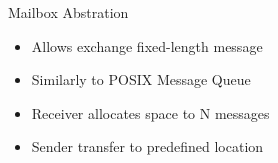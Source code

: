 		\begin{frame}[fragile]{Mailbox Abstration}
			\begin{itemize}
				\item Allows exchange fixed-length message
				\item Similarly to POSIX Message Queue
				\item Receiver allocates space to N messages
				\item Sender transfer to predefined location
			\end{itemize}



		\end{frame}

